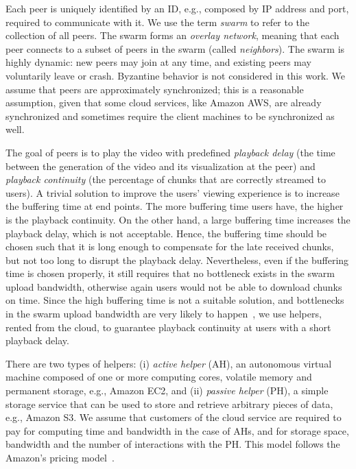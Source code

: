 Each peer is uniquely identified by an ID, e.g., composed by IP address and
port, required to communicate with it. We use the term \emph{swarm} to refer
to the collection of all peers. The swarm forms an \emph{overlay network},
meaning that each peer connects to a subset of peers in the swarm (called
\emph{neighbors}). The swarm is highly dynamic: new peers may join at any
time, and existing peers may voluntarily leave or crash. Byzantine behavior is
not considered in this work. We assume that peers are approximately synchronized; this is a reasonable
assumption, given that some cloud services, like Amazon AWS, are already
synchronized and sometimes require the client machines to be synchronized as
well.

The goal of \clive peers is to play the video with predefined \emph{playback delay} (the time between the generation of the video and its visualization at the peer) and \emph{playback continuity} (the percentage of chunks that are correctly streamed to users). A trivial solution to improve the users' viewing experience is to increase the buffering time at end points. The more buffering time users have, the higher is the playback continuity. On the other hand, a large buffering time increases the playback delay, which is not acceptable. Hence, the buffering time should be chosen such that it is long enough to compensate for the late received chunks, but not too long to disrupt the playback delay. Nevertheless, even if the buffering time is chosen properly, it still requires that no bottleneck exists in the swarm upload bandwidth, otherwise again users would not be able to download chunks on time. Since the high buffering time is not a suitable solution, and bottlenecks in the swarm upload bandwidth are very 
likely to happen~\cite{Kumar:MDT}, we use helpers, rented from the cloud, to guarantee playback continuity at users with a short playback delay.


There are two types of helpers: (i) \emph{active helper} (AH), an
autonomous virtual machine composed of one or more computing cores, volatile
memory and permanent storage, e.g., Amazon EC2, and (ii) \emph{passive
helper} (PH), a simple storage service that can be used to store and
retrieve arbitrary pieces of data, e.g., Amazon S3. We assume that
customers of the cloud service are required to pay for computing time and
bandwidth in the case of AHs, and for storage space, bandwidth and the number
of interactions with the PH. This model follows the Amazon's
pricing model~\cite{amazonec2,amazons3}.

